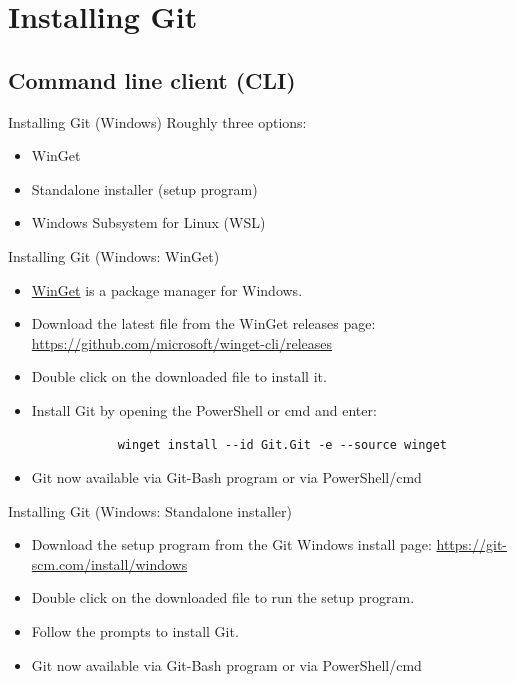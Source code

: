 \section{Installing Git}

\subsection{Command line client (CLI)}

\begin{frame}{Installing Git (Windows)}\label{installing_git_windows}
    Roughly three options:
    \begin{itemize}
        \item WinGet
        \item Standalone installer (setup program)
        \item Windows Subsystem for Linux (WSL)
    \end{itemize}
\end{frame}

\begin{frame}[fragile]{Installing Git (Windows: WinGet)}
    \begin{itemize}
        \item
            \href{https://learn.microsoft.com/en-us/windows/package-manager/winget/}{WinGet}
            is a package manager for Windows.
        \item Download the latest  file from the WinGet
            releases page:
            {\footnotesize \url{https://github.com/microsoft/winget-cli/releases}}
        \item Double click on the downloaded file to install it.
        \item Install Git by opening the PowerShell or cmd and enter:
            \begin{verbatim}
            winget install --id Git.Git -e --source winget
            \end{verbatim}
        \item Git now available via Git-Bash program or via PowerShell/cmd
    \end{itemize}
\end{frame}

\begin{frame}{Installing Git (Windows: Standalone installer)}
    \begin{itemize}
        \item Download the setup program from the Git Windows install page:
            {\footnotesize \url{https://git-scm.com/install/windows}}
        \item Double click on the downloaded file to run the setup program.
        \item Follow the prompts to install Git.
        \item Git now available via Git-Bash program or via PowerShell/cmd
    \end{itemize}
\end{frame}


